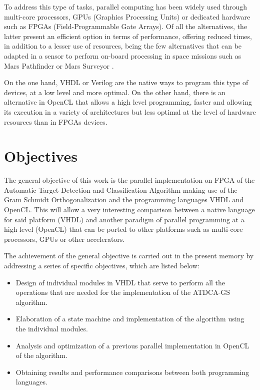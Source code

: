 To address this type of tasks, parallel computing has been widely used through multi-core processors, GPUs (Graphics Processing Units) or dedicated hardware such as FPGAs (Field-Programmable Gate Arrays). Of all the alternatives, the latter present an efficient option in terms of performance, offering reduced times, in addition to a lesser use of resources, being the few alternatives that can be adapted in a sensor to perform on-board processing in space missions such as Mars Pathfinder or Mars Surveyor \cite{biblio:TFG_Esquembri}.

On the one hand, VHDL or Verilog are the native ways to program this type of devices, at a low level and more optimal. On the other hand, there is an alternative in OpenCL that allows a high level programming, faster and allowing its execution in a variety of architectures but less optimal at the level of hardware resources than in FPGAs devices.

\section{Objectives}

The general objective of this work is the parallel implementation on FPGA of the Automatic Target Detection and Classification Algorithm \cite{ATDCA, 298007} making use of the Gram Schmidt Orthogonalization and the programming languages VHDL and OpenCL. This will allow a very interesting comparison between a native language for said platform (VHDL) and another paradigm of parallel programming at a high level (OpenCL) that can be ported to other platforms such as multi-core processors, GPUs or other accelerators.

The achievement of the general objective is carried out in the present memory by addressing a series of specific objectives, which are listed below:

\begin{itemize}
    \item Design of individual modules in VHDL that serve to perform all the operations that are needed for the implementation of the ATDCA-GS algorithm.
    \item Elaboration of a state machine and implementation of the algorithm using the individual modules.
    \item Analysis and optimization of a previous parallel implementation in OpenCL of the algorithm.
    \item Obtaining results and performance comparisons between both programming languages.
\end{itemize}

